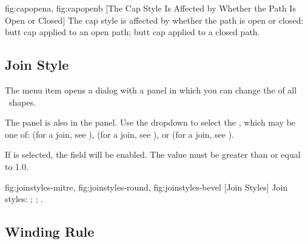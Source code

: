 {
 {fig:capopena}{}{},
 {fig:capopenb}{}{}
}
[The Cap Style Is Affected by Whether the Path Is Open or Closed]
{The cap style is affected by whether the path is open or
closed:
 butt cap applied to an open path;
 butt cap applied to a closed path.}


\subsection{Join Style}\label{sec:joinstyle}


The  menu item opens a dialog
with a  panel in which
you can change the  
of all \selected\ \glspl{shape}.


The  panel is also in the 
 panel. Use the \gls{dropdown} to select the
, which may be one of:
(for a  join, see
),
(for a  join, see
), or
(for a  join, see
).


If  is selected, the 
field will be enabled. The value must be greater than or equal to
1.0.

{
   {fig:joinstyles-mitre}{}{},
   {fig:joinstyles-round}{}{},
   {fig:joinstyles-bevel}{}{}
}
[Join Styles]
{Join styles:
 ;
 ;
 .}

\subsection{Winding Rule}\label{sec:winding}


